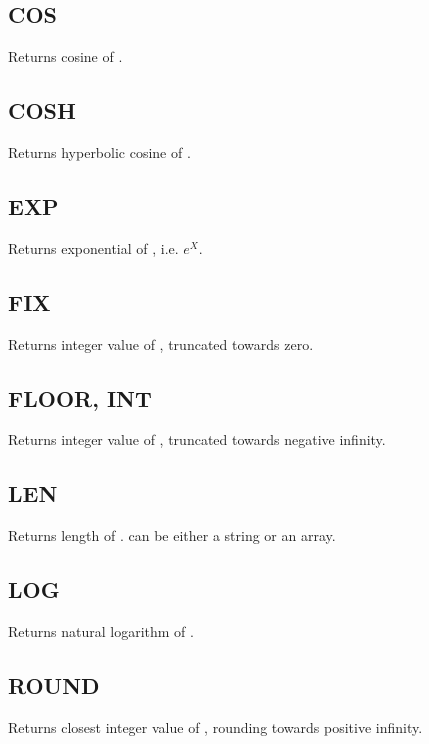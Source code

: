     \subsection{COS}
        \par
        Returns cosine of .
    \subsection{COSH}
        \par
        Returns hyperbolic cosine of .
    \subsection{EXP}
        \par
        Returns exponential of , i.e. $e^X$.
    \subsection{FIX}
        \par
        Returns integer value of , truncated towards zero.
    \subsection{FLOOR, INT}
        \par
        Returns integer value of , truncated towards negative infinity.
    \subsection{LEN}
        \par
        Returns length of .  can be either a string or an array.
    \subsection{LOG}
        \par
        Returns natural logarithm of .
    \subsection{ROUND}
        \par
        Returns closest integer value of , rounding towards positive infinity.
